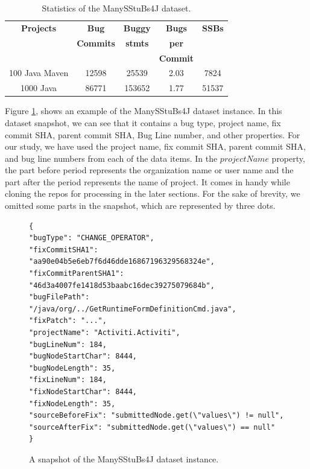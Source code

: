 \documentclass[sigconf,nonacm]{acmart}
\begin{document}
\begin{table}[h]
	\begin{tabular}{|c|c|c|c|c|}
		\hline
		\textbf{Projects}&\textbf{Bug}&\textbf{Buggy}&\textbf{Bugs}&\textbf{SSBs}\\
		& \textbf{Commits}&  \textbf{stmts} & \textbf{per}&\\
		& & & \textbf{Commit}&\\
		\hline
		100 Java Maven&12598		   & 25539	&	          2.03    &  		7824\\
		1000 Java&86771   	   & 153652	&	          1.77     &  		51537\\
		\hline
	\end{tabular}
	\caption{Statistics of the ManySStuBs4J dataset.}
	\label{tab:stat}
\end{table}
Figure \ref{fig:database_snap}, shows an example of the ManySStuBs4J dataset instance. In this dataset snapshot, we can see that it contains a bug type, project name, fix commit SHA, parent commit SHA, Bug Line number, and other properties. For our study, we have used the project name, fix commit SHA, parent commit SHA, and bug line numbers from each of the data items. In the $projectName$ property, the part before period represents the organization name or user name and the part after the period represents the name of project. It comes in handy while cloning the repos for processing in the later sections. For the sake of brevity, we omitted some parts in the snapshot, which are represented by three dots.

\begin{figure}[h]
	\centering
	\begingroup
	\fontsize{7pt}{10pt}\selectfont
	\begin{verbatim}
{
"bugType": "CHANGE_OPERATOR",
"fixCommitSHA1": "aa90e04b5e6eb7f6d46dde16867196329568324e",
"fixCommitParentSHA1": "46d3a4007fe1418d53baabc16dec39275079684b",
"bugFilePath": "/java/org/../GetRuntimeFormDefinitionCmd.java",
"fixPatch": "...",
"projectName": "Activiti.Activiti",
"bugLineNum": 184,
"bugNodeStartChar": 8444,
"bugNodeLength": 35,
"fixLineNum": 184,
"fixNodeStartChar": 8444,
"fixNodeLength": 35,
"sourceBeforeFix": "submittedNode.get(\"values\") != null",
"sourceAfterFix": "submittedNode.get(\"values\") == null"
}
	\end{verbatim}
	\endgroup
	\caption{A snapshot of the ManySStuBs4J dataset instance.}
	\label{fig:database_snap}
\end{figure}
\end{document}

